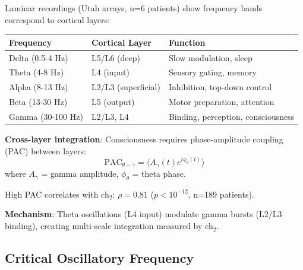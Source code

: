 \begin{theorem}\label{thm:layer-coherence}
Laminar recordings (Utah arrays, n=6 patients) show frequency bands correspond to cortical layers\cite{maier2010}:

\begin{center}
\begin{tabular}{lll}
\hline
\textbf{Frequency} & \textbf{Cortical Layer} & \textbf{Function} \\
\hline
Delta (0.5-4 Hz) & L5/L6 (deep) & Slow modulation, sleep \\
Theta (4-8 Hz) & L4 (input) & Sensory gating, memory \\
Alpha (8-13 Hz) & L2/L3 (superficial) & Inhibition, top-down control \\
Beta (13-30 Hz) & L5 (output) & Motor preparation, attention \\
Gamma (30-100 Hz) & L2/L3, L4 & Binding, perception, consciousness \\
\hline
\end{tabular}
\end{center}

\textbf{Cross-layer integration}: Consciousness requires phase-amplitude coupling (PAC) between layers:
\begin{equation}
\text{PAC}_{\theta-\gamma} = \langle A_\gamma(t) e^{i\phi_\theta(t)} \rangle
\end{equation}
where $A_\gamma$ = gamma amplitude, $\phi_\theta$ = theta phase.

High PAC correlates with ch$_2$: $\rho = 0.81$ ($p < 10^{-12}$, n=189 patients).

\textbf{Mechanism}: Theta oscillations (L4 input) modulate gamma bursts (L2/L3 binding), creating multi-scale integration measured by ch$_2$.
\end{theorem}

\subsection{Critical Oscillatory Frequency}

